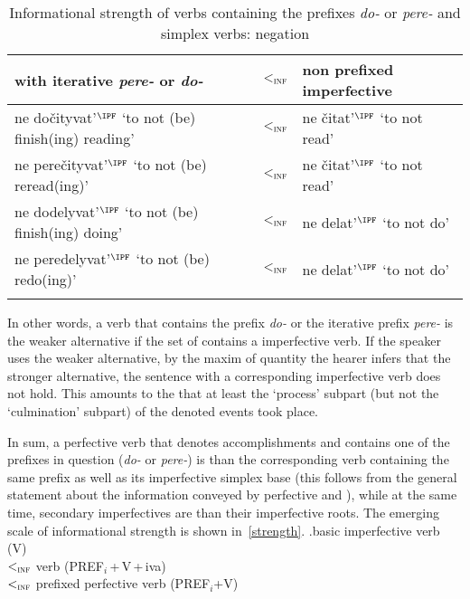 \begin{table}
\caption{Informational strength of verbs containing the prefixes \textit{do-} or \textit{pere-} and simplex verbs: negation\label{table:neg}}
\begin{tabularx}{\textwidth}{Qcl}
\lsptoprule
{}  with iterative \textit{pere-} or  \textit{do-} & $<_{\textsc{inf}}$ & non prefixed  imperfective\\
\midrule
ne do\v{c}ityvat'$^{\IPF}$ `to not (be) finish(ing) reading' & $<_{\textsc{inf}}$ & ne \v{c}itat'$^{\IPF}$ `to not read'\\
ne pere\v{c}ityvat'$^{\IPF}$ `to not (be) reread(ing)' & $<_{\textsc{inf}}$ & ne \v{c}itat'$^{\IPF}$ `to not read'\\
ne dodelyvat'$^{\IPF}$ `to not (be) finish(ing) doing' & $<_{\textsc{inf}}$ & ne delat'$^{\IPF}$ `to not do'\\
ne peredelyvat'$^{\IPF}$ `to not (be) redo(ing)' & $<_{\textsc{inf}}$ & ne delat'$^{\IPF}$ `to not do'\\
\lspbottomrule
\end{tabularx}
\end{table}

In other words, a   verb that contains the prefix \textit{do-} or the iterative prefix \textit{pere-} is the weaker alternative if the set of  contains a   imperfective verb. If the speaker uses the weaker alternative, by the maxim of quantity \citep{Grice:75} the hearer infers that the stronger alternative, the sentence with a corresponding   imperfective verb does not hold. This amounts to the  that at least the `process' subpart (but not the `culmination' subpart) of the denoted events took place.

In sum, a perfective verb that denotes accomplishments and contains one of the prefixes in question (\textit{do-} or \textit{pere-}) is  than the corresponding  verb containing the same prefix as well as its imperfective simplex base (this follows from the general statement about the information conveyed by perfective and ), while at the same time, secondary imperfectives are  than their imperfective roots. The emerging scale of informational strength is shown in~\ref{strength}.
\ex.\label{strength}basic imperfective verb (V)\\
$<_{\textsc{inf}}$  verb (PREF$_i$\,+\,V\,+\,iva)\\ $<_{\textsc{inf}}$ prefixed perfective verb (PREF$_i$+V)

